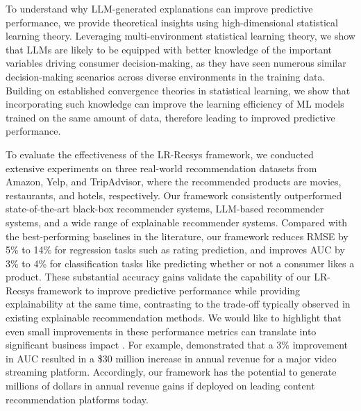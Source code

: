 



To understand why LLM-generated explanations can improve predictive performance, we provide theoretical insights using high-dimensional statistical learning theory. Leveraging multi-environment statistical learning theory, we show that LLMs are likely to be equipped with better knowledge of the important variables driving consumer decision-making, as they have seen numerous similar decision-making scenarios across diverse environments in the training data. Building on established convergence theories in statistical learning, we show that incorporating such knowledge can improve the learning efficiency of ML models trained on the same amount of data, therefore leading to improved predictive performance.

To evaluate the effectiveness of the LR-Recsys framework, we conducted extensive experiments on three real-world recommendation datasets from Amazon, Yelp, and TripAdvisor, where the recommended products are movies, restaurants, and hotels, respectively. Our framework consistently outperformed state-of-the-art black-box recommender systems, LLM-based recommender systems, and a wide range of explainable recommender systems. Compared with the best-performing baselines in the literature, our framework reduces RMSE by 5\% to 14\% for regression tasks such as rating prediction, and improves AUC by 3\% to 4\% for classification tasks like predicting whether or not a consumer likes a product. These substantial accuracy gains validate the capability of our LR-Recsys framework to improve predictive performance while providing explainability at the same time, contrasting to the trade-off typically observed in existing explainable recommendation methods. We would like to highlight that even small improvements in these performance metrics can translate into significant business impact \citep{gomez2015netflix, wang2022can, wang2024recommending}. For example, \citet{li2024variety} demonstrated that a 3\% improvement in AUC resulted in a \$30 million increase in annual revenue for a major video streaming platform. Accordingly, our framework has the potential to generate millions of dollars in annual revenue gains if deployed on leading content recommendation platforms today.


